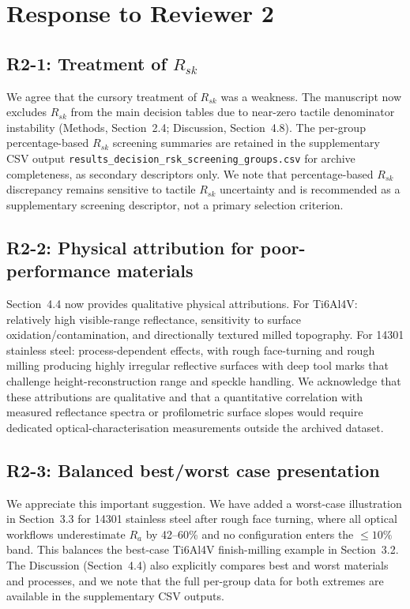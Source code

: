 \documentclass[10pt]{article}
\begin{document}
\section*{Response to Reviewer 2}

\subsection*{R2-1: Treatment of $R_{sk}$}
We agree that the cursory treatment of $R_{sk}$ was a weakness. The manuscript now excludes $R_{sk}$ from the main decision tables due to near-zero tactile denominator instability (Methods, Section~2.4; Discussion, Section~4.8). The per-group percentage-based $R_{sk}$ screening summaries are retained in the supplementary CSV output \texttt{results\_decision\_rsk\_screening\_groups.csv} for archive completeness, as secondary descriptors only. We note that percentage-based $R_{sk}$ discrepancy remains sensitive to tactile $R_{sk}$ uncertainty and is recommended as a supplementary screening descriptor, not a primary selection criterion.

\subsection*{R2-2: Physical attribution for poor-performance materials}
Section~4.4 now provides qualitative physical attributions. For Ti6Al4V: relatively high visible-range reflectance, sensitivity to surface oxidation/contamination, and directionally textured milled topography. For 14301 stainless steel: process-dependent effects, with rough face-turning and rough milling producing highly irregular reflective surfaces with deep tool marks that challenge height-reconstruction range and speckle handling. We acknowledge that these attributions are qualitative and that a quantitative correlation with measured reflectance spectra or profilometric surface slopes would require dedicated optical-characterisation measurements outside the archived dataset.

\subsection*{R2-3: Balanced best/worst case presentation}
We appreciate this important suggestion. We have added a worst-case illustration in Section~3.3 for 14301 stainless steel after rough face turning, where all optical workflows underestimate $R_a$ by 42--60\% and no configuration enters the $\leq10\%$ band. This balances the best-case Ti6Al4V finish-milling example in Section~3.2. The Discussion (Section~4.4) also explicitly compares best and worst materials and processes, and we note that the full per-group data for both extremes are available in the supplementary CSV outputs.
\end{document}
